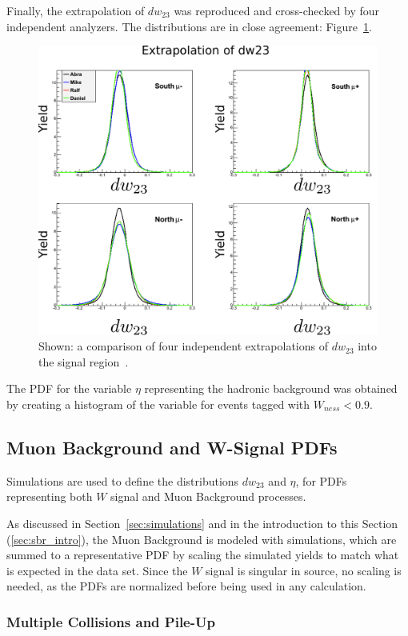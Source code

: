 Finally, the extrapolation of $dw_{23}$ was reproduced and cross-checked by four
independent analyzers. The distributions are in close agreement:
Figure~\ref{fig:four_dw23}.

\begin{figure}
  \centering
  \includegraphics[width=0.7\linewidth]{./figures/dw23_fourway.png}
  \caption{
    Shown: a comparison of four independent extrapolations of $dw_{23}$ into
    the signal region~\cite{Seidl2014a}.
  }
  \label{fig:four_dw23}
\end{figure}

The PDF for the variable $\eta$ representing the hadronic background was
obtained by creating a histogram of the variable for events tagged with
$W_{ness} < 0.9$. 

\clearpage
\subsection{Muon Background and W-Signal PDFs}
\label{sec:simulation_pdfs}


Simulations are used to define the distributions $dw_{23}$ and $\eta$, for PDFs
representing both $W$ signal and Muon Background processes.

As discussed in Section~\ref{sec:simulations} and in the introduction to this
Section (\ref{sec:sbr_intro}), the Muon Background is modeled with simulations,
which are summed to a representative PDF by scaling the simulated yields to
match what is expected in the data set. Since the $W$ signal is singular in
source, no scaling is needed, as the PDFs are normalized before being used in
any calculation.

\subsubsection{Multiple Collisions and Pile-Up}

